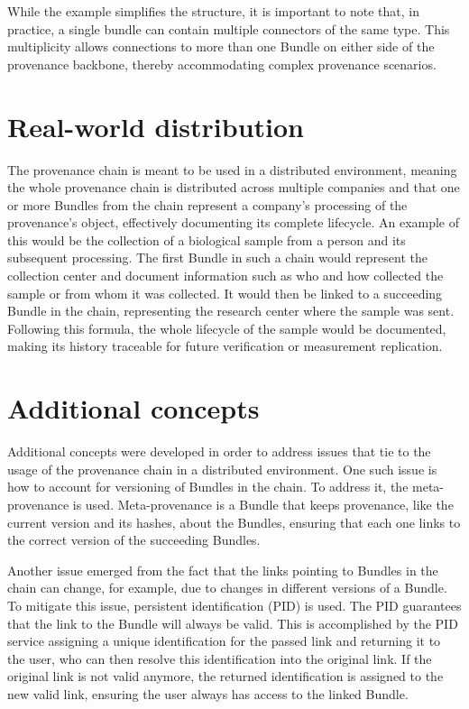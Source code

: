 \documentclass[
  digital,     %
  oneside,     %
  nosansbold,  %
  nocolorbold, %
  lof,         %
  lot,         %
]{fithesis4}
\begin{document}
While the example simplifies the structure, it is important to note that, in practice, a single bundle can contain multiple connectors of the same type. This multiplicity allows connections to more than one Bundle on either side of the provenance backbone, thereby accommodating complex provenance scenarios.
\shorthandon{-}

\section{Real-world distribution}
The provenance chain is meant to be used in a distributed environment, meaning the whole provenance chain is distributed across multiple companies and that one or more Bundles from the chain represent a company's processing of the provenance's object, effectively documenting its complete lifecycle. An example of this would be the collection of a biological sample from a person and its subsequent processing. The first Bundle in such a chain would represent the collection center and document information such as who and how collected the sample or from whom it was collected. It would then be linked to a succeeding Bundle in the chain, representing the research center where the sample was sent. Following this formula, the whole lifecycle of the sample would be documented, making its history traceable for future verification or measurement replication.

\section{Additional concepts}
Additional concepts were developed in order to address issues that tie to the usage of the provenance chain in a distributed environment. One such issue is how to account for versioning of Bundles in the chain. To address it, the meta-provenance is used. Meta-provenance is a Bundle that keeps provenance, like the current version and its hashes, about the Bundles, ensuring that each one links to the correct version of the succeeding Bundles. 

Another issue emerged from the fact that the links pointing to Bundles in the chain can change, for example, due to changes in different versions of a Bundle. To mitigate this issue, persistent identification (PID) is used. The PID guarantees that the link to the Bundle will always be valid. This is accomplished by the PID service assigning a unique identification for the passed link and returning it to the user, who can then resolve this identification into the original link. If the original link is not valid anymore, the returned identification is assigned to the new valid link, ensuring the user always has access to the linked Bundle.
\end{document}

